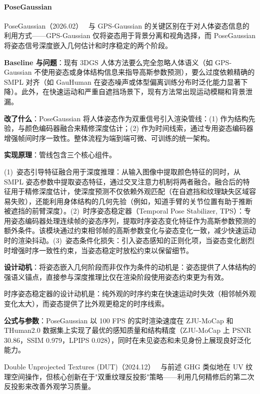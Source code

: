 \paragraph{PoseGaussian}

PoseGaussian（2026.02）~\cite{2602_05190} 与 GPS-Gaussian 的关键区别在于对人体姿态信息的利用方式——GPS-Gaussian 仅将姿态用于背景分离和视角选择，而 PoseGaussian 将姿态信号深度嵌入几何估计和时序稳定的两个阶段。

\textbf{Baseline 与问题}：现有 3DGS 人体方法要么完全忽略人体语义（如 GPS-Gaussian 不使用姿态或身体结构信息来指导高斯参数预测），要么过度依赖精确的 SMPL 对齐（如 GauHuman 在姿态噪声或体型偏离训练分布时泛化能力显著下降）。此外，在快速运动和严重自遮挡场景下，现有方法常出现运动模糊和背景泄漏。

\textbf{改了什么}：PoseGaussian 将人体姿态作为双重信号引入渲染管线：(1) 作为结构先验，与颜色编码器融合来精修深度估计；(2) 作为时间线索，通过专用姿态编码器增强帧间时序一致性。整体流程为端到端可微、可训练的统一架构。

\textbf{实现原理}：管线包含三个核心组件。

(1)~姿态引导特征融合用于深度推理：从输入图像中提取颜色特征的同时，从 SMPL 姿态参数中提取姿态特征，通过交叉注意力机制将两者融合。融合后的特征用于精修深度估计，使深度预测不仅依赖外观匹配（在自遮挡和纹理缺失区域容易失败），还能利用身体结构的几何先验（例如，知道手臂的关节位置有助于推断被遮挡的前臂深度）。(2)~时序姿态稳定器（Temporal Pose Stabilizer, TPS）：专用姿态编码器处理连续帧的姿态序列，提取时序姿态变化特征作为高斯参数预测的额外条件。该模块通过约束相邻帧的高斯参数变化与姿态变化一致，减少快速运动时的渲染抖动。(3)~姿态条件化损失：引入姿态感知的正则化项，当姿态变化剧烈时增强时序一致性约束，当姿态稳定时放松约束以保留细节。

\textbf{设计动机}：将姿态嵌入几何阶段而非仅作为条件的动机是：姿态提供了人体结构的强语义锚点，直接参与深度推理比仅在渲染阶段使用姿态约束更为有效。

时序姿态稳定器的设计动机是：纯外观的时序约束在快速运动时失效（相邻帧外观变化太大），而姿态提供了比外观更稳定的时序线索。

\textbf{公式与参数}：PoseGaussian 以 100 FPS 的实时渲染速度在 ZJU-MoCap 和 THuman2.0 数据集上实现了最优的感知质量和结构精度（ZJU-MoCap 上 PSNR 30.86，SSIM 0.979，LPIPS 0.028），同时在未见姿态和未见身份上展现良好泛化能力。

Double Unprojected Textures (DUT)（2024.12）~\cite{2412_13183} 与前述 GHG 类似地在 UV 纹理空间操作，但核心创新在于"双重纹理反投影"策略——利用几何精修后的第二次反投影来改善外观学习质量。

